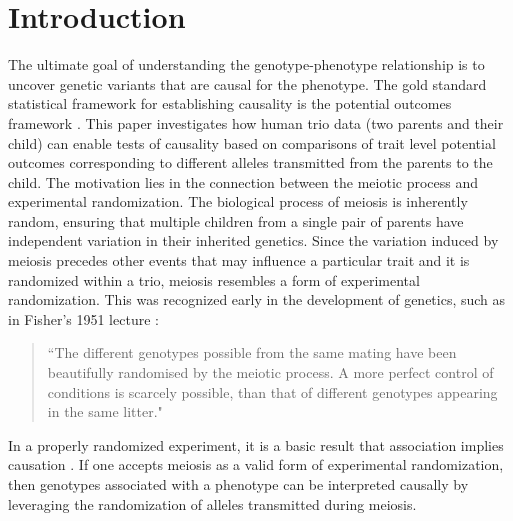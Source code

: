 \documentclass[12pt]{extarticle}
\newcommand\tocfontsize{\fontsize{12pt}{14pt}\selectfont}
\begin{document}
\clearpage

\thispagestyle{empty}

\tableofcontents

\clearpage

\setcounter{page}{1}



\section{Introduction}\label{sec:intro}

The ultimate goal of understanding the genotype-phenotype relationship is to uncover genetic variants that are causal for the phenotype. The gold standard statistical framework for establishing causality is the potential outcomes framework \citep{neyman1923, rubin1974, imbens2015}. This paper investigates how human trio data (two parents and their child) can enable tests of causality based on comparisons of trait level potential outcomes corresponding to different alleles transmitted from the parents to the child. The motivation lies in the connection between the meiotic process and experimental randomization. The biological process of meiosis is inherently random, ensuring that multiple children from a single pair of parents have independent variation in their inherited genetics. Since the variation induced by meiosis precedes other events that may influence a particular trait and it is randomized within a trio, meiosis resembles a form of experimental randomization. This was recognized early in the development of genetics, such as in Fisher's 1951 lecture \citep{fisher1952}:

\begin{quote}
``The different genotypes possible from the same mating have been beautifully randomised by the meiotic process. A more perfect control of conditions is scarcely possible, than that of different genotypes appearing in the same litter."
\end{quote}

\noindent In a properly randomized experiment, it is a basic result that association implies causation \citep{rubin1974, holland1986, greenland1990}. If one accepts meiosis as a valid form of experimental randomization, then genotypes associated with a phenotype can be interpreted causally by leveraging the randomization of alleles transmitted during meiosis.
\end{document}
